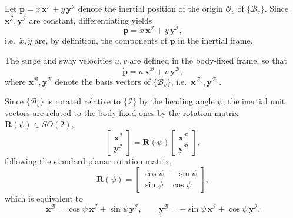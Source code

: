 Let $\mathbf{p} = x\,\mathbf{x}^{\mathcal{I}} + y\,\mathbf{y}^{\mathcal{I}}$ denote the inertial position of the origin $\mathcal{O}_v$ of $\{\mathcal{B}_v\}$. Since $\mathbf{x}^{\mathcal{I}}, \mathbf{y}^{\mathcal{I}}$ are constant, differentiating yields
\begin{equation}
    \dot{\mathbf{p}} = \dot{x}\,\mathbf{x}^{\mathcal{I}} + \dot{y}\,\mathbf{y}^{\mathcal{I}},
    \label{eq:usv_pdot_inertial_def}
\end{equation}
i.e.\ $\dot{x}, \dot{y}$ are, by definition, the components of $\dot{\mathbf{p}}$ in the inertial frame.

The surge and sway velocities $u, v$ are defined in the body-fixed frame, so that
\begin{equation}
    \dot{\mathbf{p}} = u\,\mathbf{x}^{\mathcal{B}} + v\,\mathbf{y}^{\mathcal{B}},
    \label{eq:usv_pdot_body_frame}
\end{equation}
where $\mathbf{x}^{\mathcal{B}}, \mathbf{y}^{\mathcal{B}}$ denote the basis vectors of $\{\mathcal{B}_v\}$, i.e.\ $\mathbf{x}^{\mathcal{B}_v}, \mathbf{y}^{\mathcal{B}_v}$.

Since $\{\mathcal{B}_v\}$ is rotated relative to $\{\mathcal{I}\}$ by the heading angle $\psi$, the inertial unit vectors are related to the body-fixed ones by the rotation matrix $\mathbf{R}(\psi) \in SO(2)$,
\begin{equation}
    \begin{bmatrix} \mathbf{x}^{\mathcal{I}} \\ \mathbf{y}^{\mathcal{I}} \end{bmatrix} = \mathbf{R}(\psi) \begin{bmatrix} \mathbf{x}^{\mathcal{B}} \\ \mathbf{y}^{\mathcal{B}} \end{bmatrix},
    \label{eq:usv_basis_matrix}
\end{equation}
following the standard planar rotation matrix,
\begin{equation}
    \mathbf{R}(\psi) = \begin{bmatrix} \cos\psi & -\sin\psi \\ \sin\psi & \cos\psi \end{bmatrix},
    \label{eq:usv_rotation_matrix}
\end{equation}
which is equivalent to
\begin{equation}
    \mathbf{x}^{\mathcal{B}} = \cos\psi\,\mathbf{x}^{\mathcal{I}} + \sin\psi\,\mathbf{y}^{\mathcal{I}}, \qquad
    \mathbf{y}^{\mathcal{B}} = -\sin\psi\,\mathbf{x}^{\mathcal{I}} + \cos\psi\,\mathbf{y}^{\mathcal{I}}.
    \label{eq:usv_basis_change}
\end{equation}

